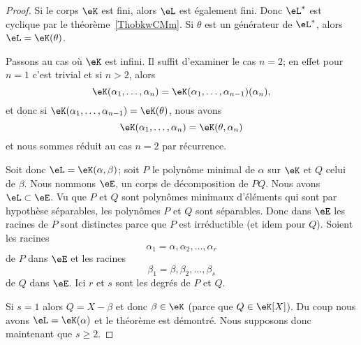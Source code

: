\begin{proof}
    Si le corps \( \eK\) est fini, alors \( \eL\) est également fini. Donc \( \eL^*\) est cyclique par le théorème~\ref{ThobkwCMm}. Si \( \theta\) est un générateur de \( \eL^*\), alors \( \eL=\eK(\theta)\).

    Passons au cas où \( \eK\) est infini. Il suffit d'examiner le cas \( n=2\); en effet pour \( n=1\) c'est trivial et si \( n>2\), alors
    \begin{equation}
        \eK(\alpha_1,\ldots, \alpha_n)=\eK(\alpha_1,\ldots, \alpha_{n-1})(\alpha_n),
    \end{equation}
    et donc si \( \eK(\alpha_1,\ldots, \alpha_{n-1})=\eK(\theta)\), nous avons
    \begin{equation}
        \eK(\alpha_1,\ldots, \alpha_n)=\eK(\theta,\alpha_n)
    \end{equation}
    et nous sommes réduit au cas \( n=2\) par récurrence.

    Soit donc \( \eL=\eK(\alpha,\beta)\); soit \( P\) le polynôme minimal de \( \alpha\) sur \( \eK\) et \( Q\) celui de \( \beta\). Nous nommons \( \eE\), un corps de décomposition de \( PQ\). Nous avons \( \eL\subset \eE\). Vu que \( P\) et \( Q\) sont polynômes minimaux d'éléments qui sont par hypothèse séparables, les polynômes \( P\) et \( Q\) sont séparables. Donc dans \( \eE\) les racines de \( P\) sont distinctes parce que \( P\) est irréductible (et idem pour \( Q\)). Soient les racines
    \begin{equation}
        \alpha_1=\alpha,\alpha_2,\ldots, \alpha_r
    \end{equation}
    de \( P\) dans \( \eE\) et les racines
    \begin{equation}
        \beta_1=\beta,\beta_2,\ldots, \beta_s
    \end{equation}
    de \( Q\) dans \( \eE\). Ici \( r\) et \( s\) sont les degrés de \( P\) et \( Q\).

    Si \( s=1\) alors \( Q=X-\beta\) et donc \( \beta\in \eK\) (parce que \( Q\in \eK[X]\)). Du coup nous avons \( \eL=\eK(\alpha)\) et le théorème est démontré. Nous supposons donc maintenant que \( s\geq 2\).


\end{proof}
